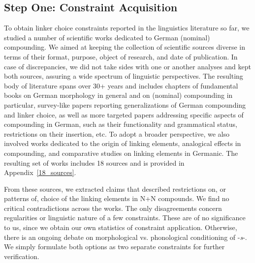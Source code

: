 \documentclass[10pt, a4paper]{article}
\begin{document}



\subsection{Step One: Constraint Acquisition}
\label{sec:constrget}

To obtain linker choice constraints reported in the linguistics literature so far, we studied a number of scientific works dedicated to German (nominal) compounding. We aimed at keeping the collection of scientific sources diverse in terms of their format, purpose, object of research, and date of publication. In case of discrepancies, we did not take sides with one or another analyses and kept both sources, assuring a wide spectrum of linguistic perspectives. The resulting body of literature spans over 30+ years and includes chapters of fundamental books on German morphology in general and on (nominal) compounding in particular, survey-like papers reporting generalizations of German compounding and linker choice, as well as more targeted papers addressing specific aspects of compounding in German, such as their functionality and grammatical status, restrictions on their insertion, etc. To adopt a broader perspective, we also involved works dedicated to the origin of linking elements, analogical effects in compounding, and comparative studies on linking elements in Germanic. The resulting set of works includes 18 sources and is provided in Appendix~\ref{18_sources}.

From these sources, we extracted claims that described restrictions on, or patterns of, choice of the linking elements in N+N compounds. We find no critical contradictions across the works. The only disagreements concern regularities or linguistic nature of a few constraints. These are of no significance to us, since we obtain our own statistics of constraint application. Otherwise, there is an ongoing debate on morphological \citep{kuerschner_2005} vs. phonological \citep{nuebling_szczepaniak_2008} conditioning of \mbox{-\textit{s}-}. We simply formulate both options as two separate constraints for further verification.
\end{document}
